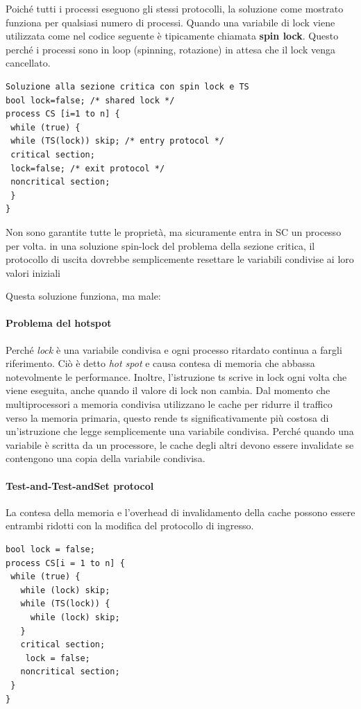 \documentclass[10pt,a4paper]{book}
\begin{document}
Poiché tutti i processi eseguono gli stessi protocolli, la soluzione come mostrato funziona per qualsiasi numero di processi. Quando una variabile di lock viene utilizzata come nel codice seguente è tipicamente chiamata \textbf{spin lock}. Questo perché i processi sono in loop (spinning, rotazione) in attesa che il lock venga cancellato. 

\begin{verbatim}
Soluzione alla sezione critica con spin lock e TS
bool lock=false; /* shared lock */
process CS [i=1 to n] {
 while (true) {
 while (TS(lock)) skip; /* entry protocol */
 critical section;
 lock=false; /* exit protocol */
 noncritical section;
 }
} 
\end{verbatim}

Non sono garantite tutte le proprietà, ma sicuramente entra in SC un processo per volta.
in una soluzione spin-lock del problema della sezione critica, il protocollo di uscita dovrebbe semplicemente resettare le variabili condivise ai loro valori iniziali

Questa soluzione funziona, ma male:

\paragraph{Problema del hotspot}
Perché \textit{lock} è una variabile condivisa e ogni processo ritardato continua a fargli riferimento. Ciò è detto \textit{hot spot} e causa contesa di memoria che abbassa notevolmente le performance.
Inoltre, l'istruzione ts scrive in lock ogni volta che viene eseguita, anche quando il valore di lock non cambia. Dal momento che multiprocessori a memoria condivisa utilizzano le cache per ridurre il traffico verso la memoria primaria, questo rende ts significativamente più costosa di un'istruzione che legge semplicemente una variabile condivisa. Perché quando una variabile è scritta da un processore, le cache degli altri devono essere invalidate se contengono una copia della variabile condivisa.

\paragraph{Test-and-Test-andSet protocol}
La contesa della memoria e l'overhead di invalidamento della cache possono essere entrambi ridotti con la modifica del protocollo di ingresso.
\begin{verbatim}
bool lock = false;
process CS[i = 1 to n] {
 while (true) {
   while (lock) skip;
   while (TS(lock)) {
     while (lock) skip;
   }
   critical section;
    lock = false;
   noncritical section;
 }
}
\end{verbatim}
\end{document}
